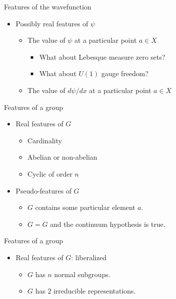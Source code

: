 \documentclass{beamer}
\begin{document}
\begin{frame}{Features of the wavefunction}

\begin{itemize}
\item Possibly real features of $\psi$

  \begin{itemize}
  \item The value of $\psi$ at a particular point $a\in X$

    \begin{itemize}
    \item What about Lebesque measure zero sets?
    \item What about $U(1)$ gauge freedom?
    \end{itemize}
  \item The value of $d\psi /dx$ at a particular point $a\in X$
  \end{itemize}
\end{itemize}
\end{frame}

\begin{frame}{Features of a group}

  \begin{itemize}
  \item Real features of $G$

    \begin{itemize}
  \item Cardinality
  \item Abelian or non-abelian
  \item Cyclic of order $n$
  \end{itemize}
\item Pseudo-features of $G$

  \begin{itemize}
  \item $G$ contains some particular element $a$.
  \item $G=G$ and the continuum hypothesis is true.
  \end{itemize}
\end{itemize}
\end{frame}

\begin{frame}{Features of a group}

\begin{itemize}
\item Real features of $G$: liberalized

  \begin{itemize}
  \item $G$ has $n$ normal subgroups.
  \item $G$ has $2$ irreducible representations.
  \end{itemize}
\end{itemize}
\end{frame}
\end{document}
